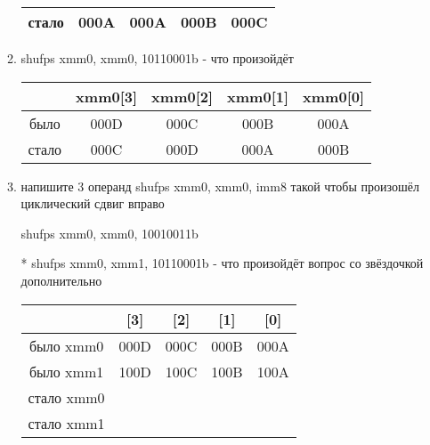 \documentclass[a4paper,10pt]{article}
\begin{document}
\begin{enumerate}
\begin{enumerate}
\begin{tabular}{|c|c|c|c|c|}
            стало &  000A &  000A &  000B &  000C \\
            \hline
        \end{tabular}
        \item shufps xmm0, xmm0, 10110001b - что произойдёт \\
        \begin{tabular}{|c|c|c|c|c|}
            \hline
             & xmm0[3] & xmm0[2] & xmm0[1] & xmm0[0] \\
             \hline
            было & 000D & 000C & 000B & 000A \\
            \hline
            стало & 000C  & 000D  &000A  &  000B \\
            \hline
        \end{tabular}
        \item напишите 3 операнд shufps xmm0, xmm0, imm8 такой чтобы произошёл циклический сдвиг вправо
        \par
            shufps xmm0, xmm0, 10010011b
        \par
        \item[*] shufps xmm0, xmm1, 10110001b - что произойдёт вопрос со звёздочкой дополнительно\\
        \begin{tabular}{|c|c|c|c|c|}
            \hline
             & [3] & [2] & [1] & [0] \\
             \hline
            было xmm0 & 000D & 000C & 000B & 000A \\
            \hline
            было xmm1 & 100D & 100C & 100B & 100A \\
            \hline
            стало xmm0 &  &  &  &  \\
            \hline
            стало xmm1 &  &  & &   \\
            \hline
        \end{tabular}
    \end{enumerate}


\end{enumerate}
\end{document}
